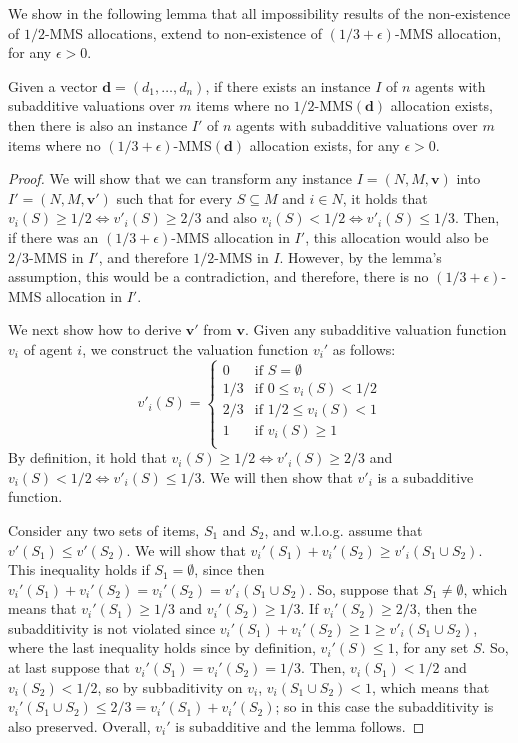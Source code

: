 We show in the following lemma that all impossibility results of the non-existence of $1/2$-MMS allocations, extend to non-existence of $(1/3+\epsilon)$-MMS allocation, for any $\epsilon > 0$.

\begin{lemma} \label{Lemma:upperBound}
    Given a vector $\boldsymbol{d}=(d_1,\ldots, d_n)$, if there exists an instance $I$ of $n$ agents with subadditive valuations over $m$ items where no $1/2$-MMS$(\boldsymbol{d})$ allocation exists, then there is also an instance $I'$ of $n$ agents with subadditive valuations over $m$ items where no $(1/3+\epsilon)$-MMS$(\boldsymbol{d})$ allocation exists, for any $\epsilon > 0$. 
\end{lemma}

\begin{proof}
    We will show that we can transform any instance $I=(N,M,\boldsymbol{v})$ into $I'=(N,M,\boldsymbol{v}')$ such that for every $S \subseteq M$ and $i \in N$, it holds that $v_i(S) \ge 1/2 \Leftrightarrow v'_i(S) \ge 2/3$ and also  $v_i(S) < 1/2 \Leftrightarrow  v'_i(S) \le 1/3$. Then, if there was an $(1/3+\epsilon)$-MMS allocation in $I'$, this allocation would also be $2/3$-MMS in $I'$, and therefore  $1/2$-MMS in $I$. However, by the lemma's assumption, this would be a contradiction, and therefore, there is no $(1/3+\epsilon)$-MMS allocation in $I'$.  

    
    We next show how to derive $\boldsymbol{v}'$ from $\boldsymbol{v}$. Given any subadditive valuation function $v_i$ of agent $i$, we construct the valuation function $v_i'$ as follows:
        $$v'_i\left(S\right) = \begin{cases}
        0 & \text{if } S = \emptyset\\
        1/3 & \text{if } 0 \le v_i(S) < 1/2\\
        2/3 & \text{if } 1/2 \le v_i(S) < 1\\
        1 & \text{if } v_i(S) \ge 1 \\
    \end{cases}$$
By definition, it hold that  $v_i(S) \ge 1/2 \Leftrightarrow v'_i(S) \ge 2/3$ and $v_i(S) < 1/2 \Leftrightarrow  v'_i(S) \le 1/3$. We will then show that $v'_i$ is a subadditive function. 

Consider any two sets of items, $S_1$ and $S_2$, and w.l.o.g. assume that $v'(S_1) \le v'(S_2)$. We will show that $v_i'(S_1)+v_i'(S_2) \geq v'_i(S_1 \cup S_2)$. This inequality holds if $S_1 = \emptyset$, since then $v_i'(S_1)+v_i'(S_2) = v_i'(S_2) = v'_i(S_1 \cup S_2)$. So, suppose that $S_1 \neq \emptyset$, which means that 
    $v_i'(S_1)\geq 1/3 $ and $ v_i'(S_2)\geq 1/3$. If $ v_i'(S_2)\geq 2/3$, then the subadditivity is not violated since $v_i'(S_1)+v_i'(S_2) \geq 1 \geq v'_i(S_1 \cup S_2)$, where the last inequality holds since by definition, $v_i'(S)\leq 1$, for any set $S$. So, at last suppose that $v_i'(S_1)=v_i'(S_2)= 1/3$. Then, $v_i(S_1)<1/2$ and $v_i(S_2)<1/2$, so by subbaditivity on $v_i$, $v_i(S_1 \cup S_2)<1$, which means that $v_i'(S_1 \cup S_2)\leq 2/3 = v_i'(S_1)+v_i'(S_2)$; so in this case the subadditivity is also preserved. Overall, $v_i'$ is subadditive and the lemma follows.  
\end{proof}

